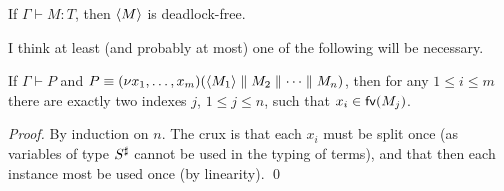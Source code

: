 \documentclass[orivec,envcountsame]{llncs}
\begin{document}

\begin{theorem}\label{thm:typed-terms-df}
  If $\Gamma \vdash M: T$, then $\langle M \rangle$ is deadlock-free.
\end{theorem}

I think at least (and probably at most) one of the following will be necessary.

\begin{lemma}\label{thm:channel-used-twice}
  If $\Gamma \vdash P$ and $P \equiv (\nu x_1,\dots,x_m)(\langle M_1 \rangle \parallel M_2 \parallel
  \dots \parallel M_n)$, then for any $1 \leq i \leq m$ there are exactly two indexes $j$, $1 \leq j
  \leq n$, such that $x_i \in \mathsf{fv}(M_j)$.
\end{lemma}

\begin{proof}
  By induction on $n$.  The crux is that each $x_i$ must be split once (as variables of type
  $S^\sharp$ cannot be used in the typing of terms), and that then each instance most be used
  once (by linearity). \qed
\end{proof}
\end{document}
